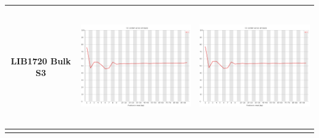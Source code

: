 \begin{center}
\begin{tabular}{ccc}
\begin{sideways}LIB1720 Bulk S3 \end{sideways} & \includegraphics[height=5cm]{Appendices/images/Sample_LIB1720_base_gc_R1.png} & \includegraphics[height=5cm]{Appendices/images/Sample_LIB1720_base_gc_R2.png} \\ \midrule  \\

\end{tabular}
\end{center}


